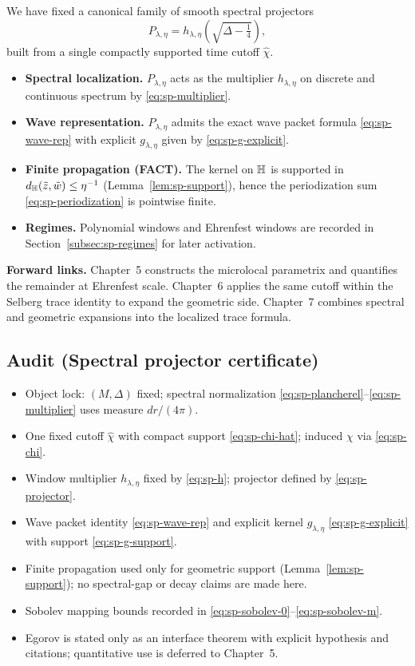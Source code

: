 We have fixed a canonical family of smooth spectral projectors
\[
P_{\lambda,\eta}=h_{\lambda,\eta}\!\left(\sqrt{\Delta-\tfrac14}\right),
\]
built from a single compactly supported time cutoff $\widehat\chi$.

\begin{itemize}
\item \textbf{Spectral localization.} $P_{\lambda,\eta}$ acts as the multiplier $h_{\lambda,\eta}$ on discrete and continuous spectrum
by \eqref{eq:sp-multiplier}.
\item \textbf{Wave representation.} $P_{\lambda,\eta}$ admits the exact wave packet formula \eqref{eq:sp-wave-rep} with explicit
$g_{\lambda,\eta}$ given by \eqref{eq:sp-g-explicit}.
\item \textbf{Finite propagation (FACT).} The kernel on $\mathbb{H}$ is supported in $d_{\mathbb{H}}(\tilde z,\tilde w)\le \eta^{-1}$
(Lemma~\ref{lem:sp-support}), hence the periodization sum \eqref{eq:sp-periodization} is pointwise finite.
\item \textbf{Regimes.} Polynomial windows and Ehrenfest windows are recorded in Section~\ref{subsec:sp-regimes} for later activation.
\end{itemize}

\noindent\textbf{Forward links.}
Chapter~5 constructs the microlocal parametrix and quantifies the remainder at Ehrenfest scale.
Chapter~6 applies the same cutoff within the Selberg trace identity to expand the geometric side.
Chapter~7 combines spectral and geometric expansions into the localized trace formula.

\subsection*{Audit (Spectral projector certificate)}\label{audit:ch4}

\begin{itemize}
\item[(S1)] Object lock: $(M,\Delta)$ fixed; spectral normalization \eqref{eq:sp-plancherel}--\eqref{eq:sp-multiplier} uses measure $dr/(4\pi)$.
\item[(S2)] One fixed cutoff $\widehat\chi$ with compact support \eqref{eq:sp-chi-hat}; induced $\chi$ via \eqref{eq:sp-chi}.
\item[(S3)] Window multiplier $h_{\lambda,\eta}$ fixed by \eqref{eq:sp-h}; projector defined by \eqref{eq:sp-projector}.
\item[(S4)] Wave packet identity \eqref{eq:sp-wave-rep} and explicit kernel $g_{\lambda,\eta}$ \eqref{eq:sp-g-explicit} with support \eqref{eq:sp-g-support}.
\item[(S5)] Finite propagation used only for geometric support (Lemma~\ref{lem:sp-support}); no spectral-gap or decay claims are made here.
\item[(S6)] Sobolev mapping bounds recorded in \eqref{eq:sp-sobolev-0}--\eqref{eq:sp-sobolev-m}.
\item[(S7)] Egorov is stated only as an interface theorem with explicit hypothesis and citations; quantitative use is deferred to Chapter~5.
\end{itemize}

